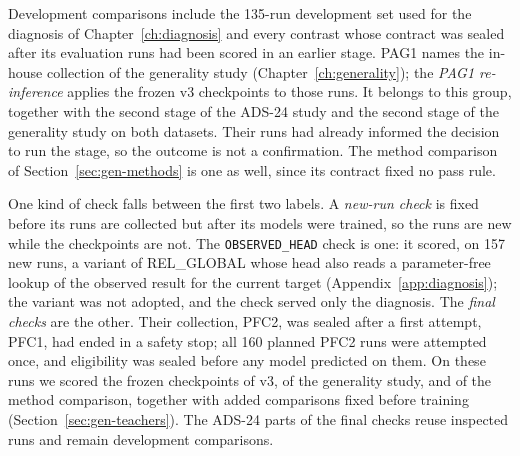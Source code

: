 Development comparisons include the 135-run development set used for
the diagnosis of Chapter~\ref{ch:diagnosis} and every contrast whose
contract was sealed after its evaluation runs had been scored in an
earlier stage. PAG1 names the in-house collection of the generality
study (Chapter~\ref{ch:generality}); the \emph{PAG1 re-inference}
applies the frozen v3 checkpoints to those runs. It belongs to this
group, together with the second stage of the ADS-24 study and the
second stage of the generality study on both datasets. Their runs had already informed the decision to run the stage, so
the outcome is not a confirmation. The method comparison of
Section~\ref{sec:gen-methods} is one as well, since its contract fixed
no pass rule.

One kind of check falls between the first two labels. A \emph{new-run check} is fixed before its runs are collected
but after its models were trained, so the runs are new while the
checkpoints are not. The \texttt{OBSERVED\_HEAD} check is one: it
scored, on 157 new runs, a variant of REL\_GLOBAL whose head also reads
a parameter-free lookup of the observed result for the current target
(Appendix~\ref{app:diagnosis}); the variant was not adopted, and the
check served only the diagnosis. The \emph{final checks} are the other. Their collection,
PFC2, was sealed after a first attempt, PFC1, had ended in a safety
stop; all 160 planned PFC2 runs were attempted once, and eligibility
was sealed before any model predicted on them. On these runs we scored the frozen checkpoints of v3, of the
generality study, and of the method comparison, together with added
comparisons fixed before training (Section~\ref{sec:gen-teachers}).
The ADS-24 parts of the final checks reuse inspected runs and remain
development comparisons.

